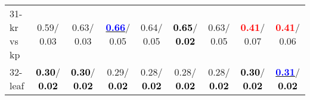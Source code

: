 \begin{table}[h]
\begin{center}
\begin{tabular}{lc|c|c|c|c|c|c|c}
31-kr vs kp &   0.59/  0.03 &   0.63/  0.03 & \underline{\textcolor{blue}{\textbf{  0.66}}}/  0.05 &   0.64/  0.05 & \textcolor{black}{\textbf{  0.65}}/\textcolor{black}{\textbf{  0.02}} &   0.63/  0.05 & \textcolor{red}{\textbf{  0.41}}/  0.07 & \textcolor{red}{\textbf{  0.41}}/  0.06 \\
32-leaf & \textcolor{black}{\textbf{  0.30}}/\textcolor{black}{\textbf{  0.02}} & \textcolor{black}{\textbf{  0.30}}/\textcolor{black}{\textbf{  0.02}} &   0.29/\textcolor{black}{\textbf{  0.02}} &   0.28/\textcolor{black}{\textbf{  0.02}} &   0.28/\textcolor{black}{\textbf{  0.02}} &   0.28/\textcolor{black}{\textbf{  0.02}} & \textcolor{black}{\textbf{  0.30}}/\textcolor{black}{\textbf{  0.02}} & \underline{\textcolor{blue}{\textbf{  0.31}}}/\textcolor{black}{\textbf{  0.02}} \\\end{tabular}\label{stratsALCKappa0bSVMRedux}
\end{center}
\end{table}
